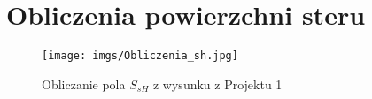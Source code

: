 \documentclass[12pt]{sprawozdanie}
\begin{document}
\appendix
\chapter{Obliczenia powierzchni steru}\label{appendix:obl}
\begin{figure}[h!]
    \centering
    \texttt{[image: imgs/Obliczenia\_sh.jpg]}
    \caption{Obliczanie pola $S_{sH}$ z wysunku z Projektu 1 \cite{Proj1}}
    \label{fig:SsH}
\end{figure}
\FloatBarrier



\end{document}
